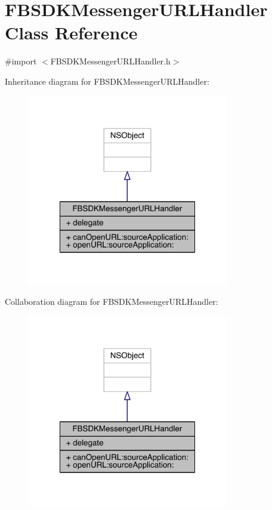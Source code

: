 \hypertarget{interface_f_b_s_d_k_messenger_u_r_l_handler}{\section{F\-B\-S\-D\-K\-Messenger\-U\-R\-L\-Handler Class Reference}
\label{interface_f_b_s_d_k_messenger_u_r_l_handler}
}


{\ttfamily \#import $<$F\-B\-S\-D\-K\-Messenger\-U\-R\-L\-Handler.\-h$>$}



Inheritance diagram for F\-B\-S\-D\-K\-Messenger\-U\-R\-L\-Handler\-:
\nopagebreak
\begin{figure}[H]
\begin{center}
\leavevmode
\includegraphics[width=248pt]{interface_f_b_s_d_k_messenger_u_r_l_handler__inherit__graph}
\end{center}
\end{figure}


Collaboration diagram for F\-B\-S\-D\-K\-Messenger\-U\-R\-L\-Handler\-:
\nopagebreak
\begin{figure}[H]
\begin{center}
\leavevmode
\includegraphics[width=248pt]{interface_f_b_s_d_k_messenger_u_r_l_handler__coll__graph}
\end{center}
\end{figure}

